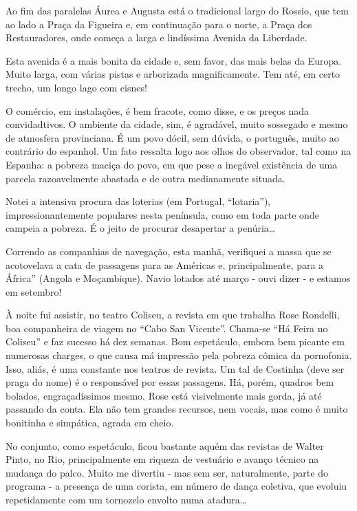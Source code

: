 Ao fim das paralelas Áurea e Augusta está o tradicional largo do Rossio, que tem ao lado a Praça da Figueira e, em continuação para o norte, a Praça dos Restauradores, onde começa a larga e lindíssima Avenida da Liberdade.

Esta avenida é a mais bonita da cidade e, sem favor, das mais belas da Europa. Muito larga, com várias pistas e arborizada magnificamente. Tem até, em certo trecho, um longo lago com cisnes!

O comércio, em instalações, é bem fracote, como disse, e os preços nada convidadtivos. O ambiente da cidade, sim, é agradável, muito sossegado e mesmo de atmosfera provinciana. É um povo dócil, sem dúvida, o português, muito ao contrário do espanhol. Um fato ressalta logo aos olhos do observador, tal como na Espanha: a pobreza maciça do povo, em que pese a inegável existência de uma parcela razoavelmente abastada e de outra medianamente situada.

Notei a intensiva procura das loterias (em Portugal, “lotaria”), impressionantemente populares nesta península, como em toda parte onde campeia a pobreza. É o jeito de procurar desapertar a penúria\ldots

Correndo as companhias de navegação, esta manhã, verifiquei a massa que se acotovelava a cata de passagens para as Américas e, principalmente, para a África” (Angola e Moçambique). Navio lotados até março - ouvi dizer - e estamos em setembro!

À noite fui assistir, no teatro Coliseu, a revista em que trabalha Rose Rondelli, boa companheira de viagem no “Cabo San Vicente”. Chama-se “Há Feira no Coliseu” e faz sucesso há dez semanas. Bom espetáculo, embora bem picante em numerosas charges, o que causa má impressão pela pobreza cômica da pornofonia. Isso, aliás, é uma constante nos teatros de revista. Um tal de Costinha (deve ser praga do nome) é o responsável por essas passagens. Há, porém, quadros bem bolados, engraçadíssimos mesmo. Rose está visivelmente mais gorda, já até passando da conta. Ela não tem grandes recursos, nem vocais, mas como é muito bonitinha e simpática, agrada em cheio.

No conjunto, como espetáculo, ficou bastante aquém das revistas de Walter Pinto, no Rio, principalmente em riqueza de vestuário e avanço técnico na mudança do palco. Muito me divertiu - mas sem ser, naturalmente, parte do programa - a presença de uma corista, em número de dança coletiva, que evoluiu repetidamente com um tornozelo envolto numa atadura\ldots

